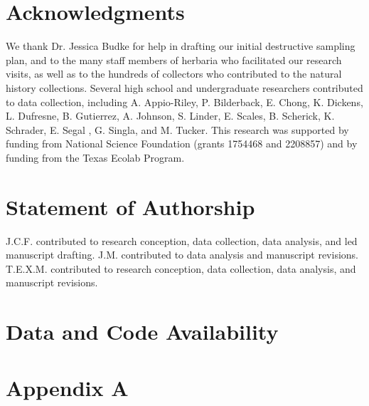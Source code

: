 \documentclass[11pt]{article}
\newcommand{\firstrevise}[1]{{\color{black}{#1}}}
\begin{document}
	\section*{Acknowledgments}
	We thank Dr. Jessica Budke for help in drafting our initial destructive sampling plan, and to the many staff members of herbaria who facilitated our research visits, as well as to the hundreds of collectors who contributed to the natural history collections. 
	Several high school and undergraduate researchers contributed to data collection, including A. Appio-Riley, P. Bilderback, E. Chong, K. Dickens, L. Dufresne, B. Gutierrez, A. Johnson, S. Linder, E. Scales, B. Scherick, K. Schrader, E. Segal , G. Singla, and M. Tucker.
	This research was supported by funding from National Science Foundation (grants 1754468 and 2208857) and by funding from the Texas Ecolab Program.
\firstrevise{Two anonymous reviewers greatly improved an earlier version of this manuscript.}


	
	\section*{Statement of Authorship}
J.C.F. contributed to research conception, data collection, data analysis, and led manuscript drafting.
J.M. contributed to data analysis and manuscript revisions.
T.E.X.M. contributed to research conception, data collection, data analysis, and manuscript revisions.

	
	\section*{Data and Code Availability}
\newpage{}
	
	
	
\newpage{}


	\section*{Appendix A}
	
\end{document}
